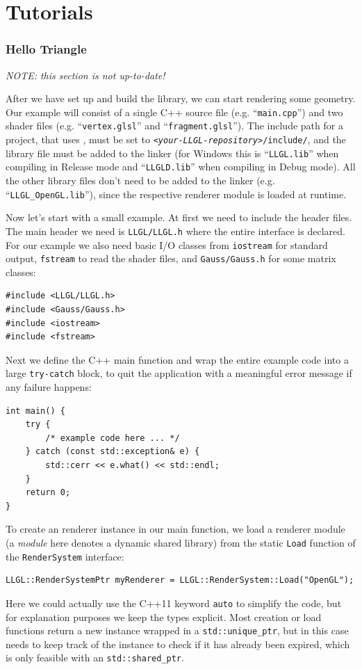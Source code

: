 \documentclass{article}
\begin{document}
\newpage
\part{Tutorials}

\section{Hello Triangle}

\textit{NOTE: this section is not up-to-date!} \\
\noindent

After we have set up and build the library, we can start rendering some geometry.
Our example will consist of a single C++ source file (e.g. ``\texttt{main.cpp}'') and two shader files
(e.g. ``\texttt{vertex.glsl}'' and ``\texttt{fragment.glsl}'').
The include path for a project, that uses \LLGL, must be set to \texttt{\textit{<your-LLGL-repository>}/include/},
and the \LLGL library file must be added to the linker (for Windows this is ``\texttt{LLGL.lib}''
when compiling in Release mode and ``\texttt{LLGLD.lib}'' when compiling in Debug mode).
All the other library files don't need to be added to the linker (e.g. ``\texttt{LLGL\_OpenGL.lib}''),
since the respective renderer module is loaded at runtime.

Now let's start with a small example. At first we need to include the header files.
The main header we need is \texttt{LLGL/LLGL.h} where the entire \LLGL interface is declared.
For our example we also need basic I/O classes from \texttt{iostream} for standard output, \texttt{fstream}
to read the shader files, and \texttt{Gauss/Gauss.h} for some matrix classes:
\begin{lstlisting}
#include <LLGL/LLGL.h>
#include <Gauss/Gauss.h>
#include <iostream>
#include <fstream>
\end{lstlisting}
Next we define the C++ main function and wrap the entire example code into a large \texttt{try-catch} block,
to quit the application with a meaningful error message if any failure happens:
\begin{lstlisting}
int main() {
    try {
        /* example code here ... */
    } catch (const std::exception& e) {
        std::cerr << e.what() << std::endl;
    }
    return 0;
}
\end{lstlisting}
To create an \LLGL renderer instance in our main function, we load a renderer module
(a \textit{module} here denotes a dynamic shared library)
from the static \texttt{Load} function of the \texttt{RenderSystem} interface:
\begin{lstlisting}
LLGL::RenderSystemPtr myRenderer = LLGL::RenderSystem::Load("OpenGL");
\end{lstlisting}
Here we could actually use the C++11 keyword \texttt{auto} to simplify the code,
but for explanation purposes we keep the types explicit.
Most creation or load functions return a new instance wrapped in a \texttt{std::unique\_ptr},
but in this case \LLGL needs to keep track of the instance to check if it has already been expired,
which is only feasible with an \texttt{std::shared\_ptr}.
\end{document}
